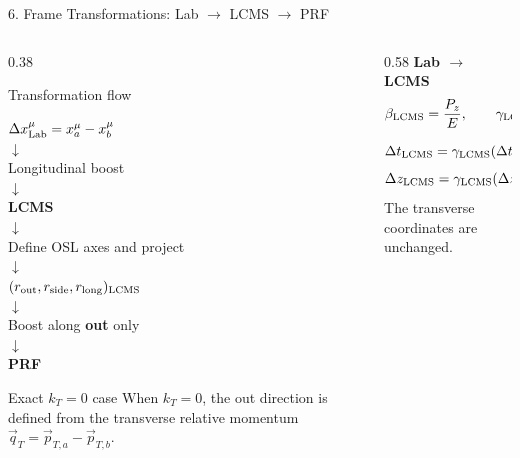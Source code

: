 \documentclass{beamer}
\begin{document}
\begin{frame}{6. Frame Transformations: Lab $\rightarrow$ LCMS $\rightarrow$ PRF}
\fontsize{6.5}{7.2}\selectfont

\begin{columns}[T]

\begin{column}{0.38\textwidth}
\begin{block}{Transformation flow}
\begin{center}
$\Delta x^\mu_{\rm Lab}=x_a^\mu-x_b^\mu$\\[-0.15em]
$\downarrow$\\[-0.15em]
Longitudinal boost\\[-0.15em]
$\downarrow$\\[-0.15em]
\textbf{LCMS}\\[-0.15em]
$\downarrow$\\[-0.15em]
Define OSL axes and project\\[-0.15em]
$\downarrow$\\[-0.15em]
$(r_{\rm out},r_{\rm side},r_{\rm long})_{\rm LCMS}$\\[-0.15em]
$\downarrow$\\[-0.15em]
Boost along \textbf{out} only\\[-0.15em]
$\downarrow$\\[-0.15em]
\textbf{PRF}
\end{center}
\end{block}

\vspace{-0.3em}
\begin{alertblock}{Exact $k_T=0$ case}
When $k_T=0$, the out direction is defined from the transverse relative momentum
$\vec q_T=\vec p_{T,a}-\vec p_{T,b}$.
\end{alertblock}
\end{column}

\begin{column}{0.58\textwidth}
\textbf{Lab $\rightarrow$ LCMS}
\vspace{-0.4em}
\[
\beta_{\rm LCMS}=\frac{P_z}{E},
\qquad
\gamma_{\rm LCMS}=\frac{1}{\sqrt{1-\beta_{\rm LCMS}^2}}.
\]
\vspace{-0.6em}
\[
\Delta t_{\rm LCMS}=\gamma_{\rm LCMS}
(\Delta t_{\rm Lab}-\beta_{\rm LCMS}\Delta z_{\rm Lab}),
\]
\vspace{-0.65em}
\[
\Delta z_{\rm LCMS}=\gamma_{\rm LCMS}
(\Delta z_{\rm Lab}-\beta_{\rm LCMS}\Delta t_{\rm Lab}).
\]
\vspace{-0.35em}
The transverse coordinates are unchanged.


\end{column}
\end{columns}
\end{frame}
\end{document}
